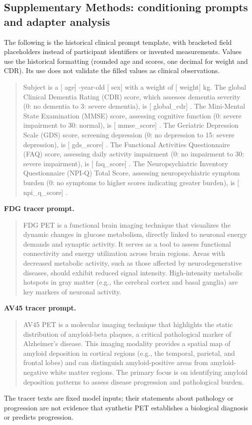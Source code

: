 \documentclass{article}
\providecommand{\DIFaddtex}[1]{{\protect\color{blue} \sf #1}} %
\providecommand{\DIFadd}[1]{\texorpdfstring{\DIFaddtex{#1}}{#1}} %
\begin{document}
\subsection*{\DIFadd{Supplementary Methods: conditioning prompts and adapter analysis}}
\DIFadd{The following is the historical clinical prompt template, with bracketed field placeholders instead of participant identifiers or invented measurements. Values use the historical formatting (rounded age and scores, one decimal for weight and CDR). Its use does not validate the filled values as clinical observations.
}\begin{quote}\small
\DIFadd{Subject is a }[\DIFadd{age}]\DIFadd{-year-old }[\DIFadd{sex}] \DIFadd{with a weight of }[\DIFadd{weight}] \DIFadd{kg. The global Clinical Dementia Rating (CDR) score, which assesses dementia severity (0: no dementia to 3: severe dementia), is }[\DIFadd{global\_cdr}]\DIFadd{. The Mini-Mental State Examination (MMSE) score, assessing cognitive function (0: severe impairment to 30: normal), is }[\DIFadd{mmse\_score}]\DIFadd{. The Geriatric Depression Scale (GDS) score, screening depression (0: no depression to 15: severe depression), is }[\DIFadd{gds\_score}]\DIFadd{. The Functional Activities Questionnaire (FAQ) score, assessing daily activity impairment (0: no impairment to 30: severe impairment), is }[\DIFadd{faq\_score}]\DIFadd{. The Neuropsychiatric Inventory Questionnaire (NPI-Q) Total Score, assessing neuropsychiatric symptom burden (0: no symptoms to higher scores indicating greater burden), is }[\DIFadd{npi\_q\_score}]\DIFadd{.
}\end{quote}
\noindent\DIFadd{\textbf{FDG tracer prompt.}
}\begin{quote}\small
\DIFadd{FDG PET is a functional brain imaging technique that visualizes the dynamic changes in glucose metabolism, directly linked to neuronal energy demands and synaptic activity. It serves as a tool to assess functional connectivity and energy utilization across brain regions. Areas with decreased metabolic activity, such as those affected by neurodegenerative diseases, should exhibit reduced signal intensity. High-intensity metabolic hotspots in gray matter (e.g., the cerebral cortex and basal ganglia) are key markers of neuronal activity. 
}\end{quote}
\noindent\DIFadd{\textbf{AV45 tracer prompt.}
}\begin{quote}\small
\DIFadd{AV45 PET is a molecular imaging technique that highlights the static distribution of amyloid-beta plaques, a critical pathological marker of Alzheimer's disease. This imaging modality provides a spatial map of amyloid deposition in cortical regions (e.g., the temporal, parietal, and frontal lobes) and can distinguish amyloid-positive areas from amyloid-negative white matter regions. The primary focus is on identifying amyloid deposition patterns to assess disease progression and pathological burden.
}\end{quote}
\DIFadd{The tracer texts are fixed model inputs; their statements about pathology or progression are not evidence that synthetic PET establishes a biological diagnosis or predicts progression.
}
\end{document}
